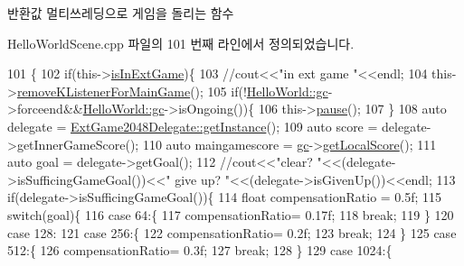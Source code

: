 \begin{DoxyReturn}{반환값}
멀티쓰레딩으로 게임을 돌리는 함수 
\end{DoxyReturn}


Hello\+World\+Scene.\+cpp 파일의 101 번째 라인에서 정의되었습니다.


\begin{DoxyCode}
101                                   \{
102     \textcolor{keywordflow}{if}(this->\hyperlink{class_hello_world_a6dcd196f83b5eba681717366944fcddf}{isInExtGame})\{
103         \textcolor{comment}{//cout<<"in ext game "<<endl;}
104         this->\hyperlink{class_hello_world_aa4aaf4a6d2ae2e0cb07273d0ee004861}{removeKListenerForMainGame}();
105         \textcolor{keywordflow}{if}(!\hyperlink{class_hello_world_a547cb213126911d9a7151f8259dc7102}{HelloWorld::gc}->forceend&&\hyperlink{class_hello_world_a547cb213126911d9a7151f8259dc7102}{HelloWorld::gc}->isOngoing())\{
106             this->\hyperlink{class_hello_world_af72bece97d2fe997936df92723636298}{pause}();
107         \}
108         \textcolor{keyword}{auto} delegate = \hyperlink{classhsh_1_1_code_lady_j_j_y_1_1game2048_1_1_scene_delegate_a332a574da455fb687b5d283399a6976c}{ExtGame2048Delegate::getInstance}();
109         \textcolor{keyword}{auto} score = delegate->getInnerGameScore();
110         \textcolor{keyword}{auto} maingamescore = \hyperlink{class_hello_world_a547cb213126911d9a7151f8259dc7102}{gc}->\hyperlink{class_tetris_1_1_game_controller_ad88f3362af23d87282ee8ed39394054d}{getLocalScore}();
111         \textcolor{keyword}{auto} goal = delegate->getGoal();
112         \textcolor{comment}{//cout<<"clear? "<<(delegate->isSufficingGameGoal())<<" give up? "<<(delegate->isGivenUp())<<endl;}
113         \textcolor{keywordflow}{if}(delegate->isSufficingGameGoal())\{
114             \textcolor{keywordtype}{float} compensationRatio = 0.5f;
115             \textcolor{keywordflow}{switch}(goal)\{
116                 \textcolor{keywordflow}{case} 64:\{
117                     compensationRatio= 0.17f;
118                     \textcolor{keywordflow}{break};
119                 \}
120                 \textcolor{keywordflow}{case} 128:
121                 \textcolor{keywordflow}{case} 256:\{
122                    compensationRatio= 0.2f;
123                     \textcolor{keywordflow}{break};
124                 \}
125                 \textcolor{keywordflow}{case} 512:\{
126                     compensationRatio= 0.3f;
127                     \textcolor{keywordflow}{break};
128                 \}
129                 \textcolor{keywordflow}{case} 1024:\{

\end{DoxyCode}
